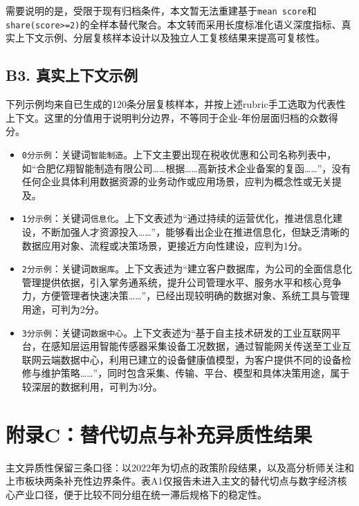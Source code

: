需要说明的是，受限于现有归档条件，本文暂无法重建基于\texttt{mean\ score}和\texttt{share(score\textgreater{}=2)}的全样本替代聚合。本文转而采用长度标准化语义深度指标、真实上下文示例、分层复核样本设计以及独立人工复核结果来提高可复核性。

\subsection{B3. 真实上下文示例}\label{b3-ux771fux5b9eux4e0aux4e0bux6587ux793aux4f8b}

下列示例均来自已生成的120条分层复核样本，并按上述rubric手工选取为代表性上下文。这里的分值用于说明判分边界，不等同于企业-年份层面归档的众数得分。

\begin{itemize}
\tightlist
\item
  \texttt{0分示例}：关键词\texttt{智能制造}。上下文主要出现在税收优惠和公司名称列表中，如``合肥亿翔智能制造有限公司\ldots\ldots 根据\ldots\ldots 高新技术企业备案的复函\ldots\ldots''，没有任何企业具体利用数据资源的业务动作或应用场景，应判为概念性或无关提及。
\item
  \texttt{1分示例}：关键词\texttt{信息化}。上下文表述为``通过持续的运营优化，推进信息化建设，不断加强人才资源投入\ldots\ldots''，能够看出企业在推进信息化，但缺乏清晰的数据应用对象、流程或决策场景，更接近方向性建设，应判为1分。
\item
  \texttt{2分示例}：关键词\texttt{数据库}。上下文表述为``建立客户数据库，为公司的全面信息化管理提供依据，引入掌务通系统，提升公司管理水平、服务水平和核心竞争力，方便管理者快速决策\ldots\ldots''，已经出现较明确的数据对象、系统工具与管理用途，可判为2分。
\item
  \texttt{3分示例}：关键词\texttt{数据中心}。上下文表述为``基于自主技术研发的工业互联网平台，在感知层运用智能传感器采集设备工况数据，通过智能网关传送至工业互联网云端数据中心，利用已建立的设备健康值模型，为客户提供不同的设备检修与维护策略\ldots\ldots''，同时包含采集、传输、平台、模型和具体决策用途，属于较深层的数据利用，可判为3分。
\end{itemize}

\section{附录C：替代切点与补充异质性结果}\label{ux9644ux5f55cux66ffux4ee3ux5207ux70b9ux4e0eux8865ux5145ux5f02ux8d28ux6027ux7ed3ux679c}

主文异质性保留三条口径：以2022年为切点的政策阶段结果，以及高分析师关注和上市板块两条补充性边界条件。表A1仅报告未进入主文的替代切点与数字经济核心产业口径，便于比较不同分组在统一滞后规格下的稳定性。

